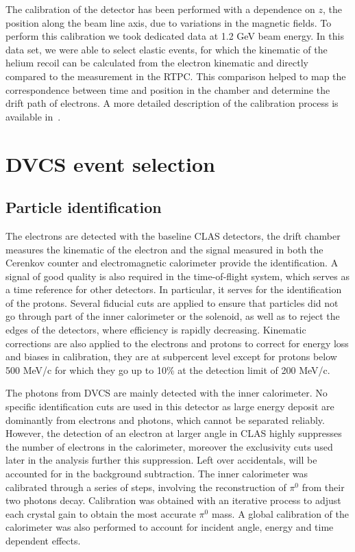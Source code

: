 \documentclass{article}
\begin{document}
The calibration of the detector has been performed with a 
dependence on $z$, the position along the beam line axis, due to 
variations in the magnetic fields. To perform this calibration we took  
dedicated data at 1.2 GeV beam energy. In 
this data set, we were able to select elastic events, for which the kinematic 
of the helium recoil can be calculated from the electron kinematic and 
directly compared to the measurement in the RTPC. This comparison helped to 
map the correspondence between time and position in the chamber and determine 
the drift path of electrons. A more detailed description of the calibration process 
is available in~\cite{Dupre:2017upj}.

\section{DVCS event selection}

\subsection{Particle identification}

The electrons are detected with the baseline CLAS detectors, the drift chamber measures the kinematic 
of the electron and the signal measured in both the Cerenkov counter and electromagnetic calorimeter
provide the identification. A signal of good quality is also required in the 
time-of-flight system, which serves as a time reference for other detectors. In particular, it 
serves for the identification of the protons. Several 
fiducial cuts are applied to ensure that particles did not go through part of the inner calorimeter 
or the solenoid, as well as to reject the edges of the detectors, where efficiency is rapidly 
decreasing. Kinematic corrections are also applied to the electrons and protons to correct for energy loss
and biases in calibration, they are at subpercent level except for protons below 500 MeV/c for which they
go up to 10\% at the detection limit of 200 MeV/c.

The photons from DVCS are mainly detected with the inner calorimeter. No specific 
identification cuts are used in this detector as large energy deposit are dominantly 
from electrons and photons, which cannot be separated reliably. However, the detection 
of an electron at larger angle in CLAS 
highly suppresses the number of electrons in the calorimeter, moreover
the exclusivity cuts used later in the analysis further this suppression. Left over accidentals, will be
accounted for in the background subtraction. The inner calorimeter was calibrated through a series
of steps, involving the reconstruction of $\pi^0$ from their two photons decay. Calibration was obtained 
with an iterative process to adjust each crystal gain to obtain the most accurate $\pi^0$ mass. A
global calibration of the calorimeter was also performed to account for incident angle, energy and 
time dependent effects.
\end{document}
